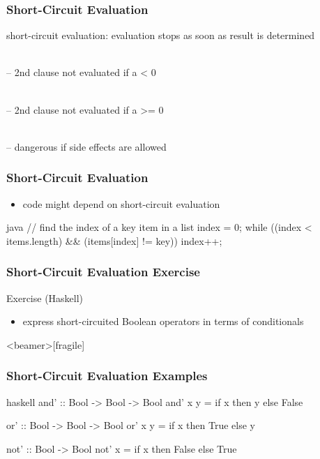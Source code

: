 \documentclass[dvipsnames]{beamer}
\theoremstyle{plain}
\begin{document}
\begin{frame}
  \frametitle{Short-Circuit Evaluation}

  \begin{definition}
    \alert{short-circuit evaluation}: evaluation stops
      as soon as result is determined
  \end{definition}

  \pause
  \begin{example}
    \\
    -- 2nd clause not evaluated if a < 0

    \bigskip
    \\
    -- 2nd clause not evaluated if a >= 0

    \pause
    \bigskip
    \\
    -- dangerous if side effects are allowed
  \end{example}
\end{frame}

\begin{frame}[fragile]
  \frametitle{Short-Circuit Evaluation}

  \begin{itemize}
    \item code might depend on short-circuit evaluation
  \end{itemize}

  \begin{example}[Java]
    \begin{pygments}{java}
// find the index of a key item in a list
index = 0;
while ((index < items.length) && (items[index] != key))
    index++;
    \end{pygments}
  \end{example}
\end{frame}

\begin{frame}
  \frametitle{Short-Circuit Evaluation Exercise}

  \begin{block}{Exercise (Haskell)}
    \begin{itemize}
      \item express short-circuited Boolean operators in terms of conditionals
    \end{itemize}
  \end{block}
\end{frame}

\begin{frame}<beamer>[fragile]
  \frametitle{Short-Circuit Evaluation Examples}

  \begin{example}[Haskell]
    \begin{pygments}{haskell}
and' :: Bool -> Bool -> Bool
and' x y = if x then y else False

or' :: Bool -> Bool -> Bool
or' x y = if x then True else y

not' :: Bool -> Bool
not' x = if x then False else True
    \end{pygments}
  \end{example}
\end{frame}
\end{document}
